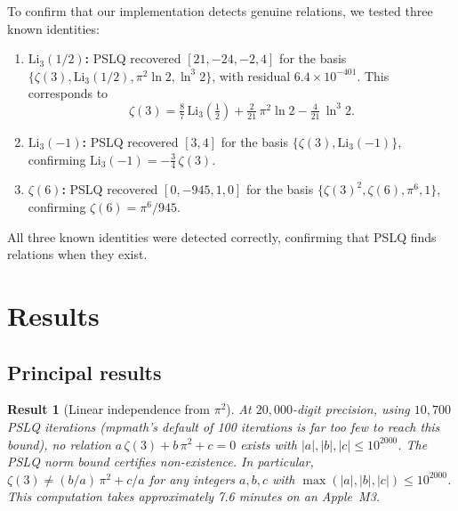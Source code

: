 \documentclass[12pt]{article}
\newtheorem{result}[theorem]{Result}
\theoremstyle{definition}
\theoremstyle{remark}
\begin{document}
To confirm that our implementation detects genuine relations, we
tested three known identities:

\begin{enumerate}
  \item \textbf{$\mathrm{Li}_3(1/2)$:} PSLQ recovered $[21,-24,-2,4]$ for
    the basis $\{\zeta(3),\mathrm{Li}_3(1/2),\pi^2\ln 2,\ln^{3} 2\}$,
    with residual $6.4\times 10^{-401}$.  This corresponds to
    \[
      \zeta(3) = \tfrac{8}{7}\,\mathrm{Li}_3(\tfrac{1}{2})
               + \tfrac{2}{21}\,\pi^2\ln 2
               - \tfrac{4}{21}\,\ln^{3} 2.
    \]

  \item \textbf{$\mathrm{Li}_3(-1)$:} PSLQ recovered $[3,4]$ for the basis
    $\{\zeta(3),\mathrm{Li}_3(-1)\}$, confirming
    $\mathrm{Li}_3(-1)=-\tfrac{3}{4}\,\zeta(3)$.

  \item \textbf{$\zeta(6)$:} PSLQ recovered $[0,-945,1,0]$ for the
    basis $\{\zeta(3)^2,\zeta(6),\pi^6,1\}$, confirming
    $\zeta(6)=\pi^6/945$.
\end{enumerate}

\noindent All three known identities were detected correctly,
confirming that PSLQ finds relations when they exist.


\section{Results}\label{sec:results}

\subsection{Principal results}\label{sec:principal}

\begin{result}[Linear independence from $\pi^2$]\label{res:A}
At $20{,}000$-digit precision, using $10{,}700$ PSLQ iterations
(mpmath's default of 100 iterations is far too few to reach this
bound), no relation $a\,\zeta(3)+b\,\pi^2+c=0$ exists with
$|a|,|b|,|c|\le 10^{2000}$.  The PSLQ norm bound certifies
non-existence.  In particular, $\zeta(3)\ne(b/a)\,\pi^2+c/a$ for any
integers $a,b,c$ with $\max(|a|,|b|,|c|)\le 10^{2000}$.  This
computation takes approximately 7.6 minutes on an Apple~M3.
\end{result}
\end{document}
